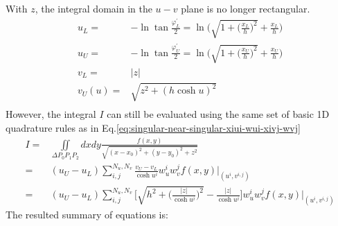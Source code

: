 \documentclass [10pt,letterpaper]{article}
\begin{document}
With $z$, the integral domain in the $u-v$ plane is no longer rectangular.  
\begin{equation} \label{eq:radial-angular-method-uL-uU-vL-uU}
	\begin{split} 
		u_L	=&
			-\ln{\tan{\frac{\varphi^{\prime}_L}{2}}}
			= 
			\ln\bigg(
				\sqrt{1+\bigg(\frac{x_L}{h}\bigg)^2}
				+ \frac{x_L}{h}
			\bigg)
		\\
		u_U	=&
			-\ln{\tan{\frac{\varphi^{\prime}_U}{2}}}
			= 
			\ln\bigg(
				\sqrt{1+\bigg(\frac{x_U}{h}\bigg)^2}
				+ \frac{x_U}{h}
			\bigg)
		\\
		v_L	=&	\lvert z \rvert				\\
		v_U(u)	=&	\sqrt{ z^2 + (h \cosh{u})^2 }		\\ 
	\end{split}
\end{equation}
However, the integral $I$ can still be evaluated using the same set of basic 1D quadrature rules as in Eq.\eqref{eq:singular-near-singular-xiui-wui-xivj-wvj}
\begin{equation} \label{eq:radial-angular-method-quadrature-rule-result}
	\begin{split} 
		I
		=&
		\iint \limits_{\Delta P_0 P_1 P_2}
		dx dy
		\frac{ f(x,y) } { \sqrt{ (x-x_0)^2 + (y-y_0)^2 + z^2 } }
		\\
		=&
		(u_U-u_L)
		\sum \nolimits_{i,j}^{N_u,N_v} 
		\frac{ v_U-v_L }{ \cosh{u^i} }
		w_u^i w_v^j
		f(x,y)
		\big\vert
		_{ (u^i,v^{i,j}) }
		\\
		=&
		(u_U-u_L)
		\sum \nolimits_{i,j}^{N_u,N_v} 
		\bigg [
			\sqrt{ h^2 + \bigg(
				\frac{ \lvert z \rvert } { \cosh{u^i} } \bigg)^2 }
			- \frac{ \lvert z \rvert } { \cosh{u^i} }
		\bigg ]
		w_u^i w_v^j
		f(x,y)
		\big\vert
		_{ (u^i,v^{i,j}) }
	\end{split}
\end{equation}
The resulted summary of equations is:
\end{document}
